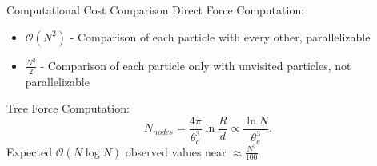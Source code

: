 \begin{frame}{Computational Cost Comparison}
	Direct Force Computation:
	\begin{itemize}
		\item $\mathcal{O}(N^2)$ - Comparison of each particle with every other, parallelizable
		\item $\frac{N^2}{2}$ - Comparison of each particle only with unvisited particles, not parallelizable
	\end{itemize} \bigskip


	Tree Force Computation:
	\begin{equation}
		N_{nodes}=\frac{4 \pi}{\theta_c^3} \ln \frac{R}{d} \propto \frac{\ln N}{\theta_c^3} .
	\end{equation}
	Expected $\mathcal{O}(N\log{N})$ observed values near $\approx\frac{N^2}{100}$
\end{frame}
